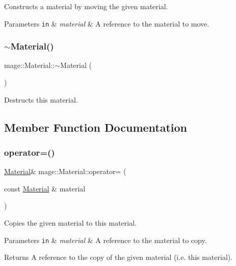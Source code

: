 Constructs a material by moving the given material.


\begin{DoxyParams}[1]{Parameters}
\mbox{\tt in}  & {\em material} & A reference to the material to move. \\
\hline
\end{DoxyParams}
\hypertarget{structmage_1_1_material_a4ca65b7e24144ee08dd1ce8d0eda9284}{}\label{structmage_1_1_material_a4ca65b7e24144ee08dd1ce8d0eda9284} 
\subsubsection{\texorpdfstring{$\sim$\+Material()}{~Material()}}
{\footnotesize\ttfamily mage\+::\+Material\+::$\sim$\+Material (\begin{DoxyParamCaption}{ }\end{DoxyParamCaption})\hspace{0.3cm}{\ttfamily [default]}}

Destructs this material. 

\subsection{Member Function Documentation}
\hypertarget{structmage_1_1_material_a7ebc9986924ca13ae8468005518dcfc7}{}\label{structmage_1_1_material_a7ebc9986924ca13ae8468005518dcfc7} 
\subsubsection{\texorpdfstring{operator=()}{operator=()}\hspace{0.1cm}{\footnotesize\ttfamily [1/2]}}
{\footnotesize\ttfamily \hyperlink{structmage_1_1_material}{Material}\& mage\+::\+Material\+::operator= (\begin{DoxyParamCaption}\item[{const \hyperlink{structmage_1_1_material}{Material} \&}]{material }\end{DoxyParamCaption})\hspace{0.3cm}{\ttfamily [default]}}

Copies the given material to this material.


\begin{DoxyParams}[1]{Parameters}
\mbox{\tt in}  & {\em material} & A reference to the material to copy. \\
\hline
\end{DoxyParams}
\begin{DoxyReturn}{Returns}
A reference to the copy of the given material (i.\+e. this material). 
\end{DoxyReturn}
\hypertarget{structmage_1_1_material_a500a2ebe99d4d7b3be5bf57b6bff62a1}{}\label{structmage_1_1_material_a500a2ebe99d4d7b3be5bf57b6bff62a1} 

